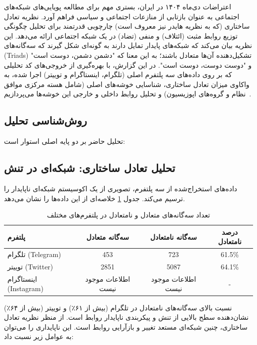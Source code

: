 \documentclass{article}
\begin{document}
	اعتراضات دی‌ماه ۱۴۰۴ در ایران، بستری مهم برای مطالعه پویایی‌های شبکه‌های اجتماعی به عنوان بازتابی از منازعات اجتماعی و سیاسی فراهم آورد. نظریه تعادل ساختاری (که به نظریه هایدر نیز معروف است) چارچوبی قدرتمند برای تحلیل چگونگی توزیع روابط مثبت (ائتلاف) و منفی (تضاد) در یک شبکه اجتماعی ارائه می‌دهد. این نظریه بیان می‌کند که شبکه‌های پایدار تمایل دارند به گونه‌ای شکل گیرند که سه‌گانه‌های (Triads) تشکیل‌دهنده آن‌ها متعادل باشند؛ به این معنا که "دشمن دشمن، دوست است" و "دوست دوست، دوست است". در این گزارش، با بهره‌گیری از خروجی‌های کد تحلیلی که بر روی داده‌های سه پلتفرم اصلی (تلگرام، اینستاگرام و توییتر) اجرا شده، به واکاوی میزان تعادل ساختاری، شناسایی خوشه‌های اصلی (شامل هسته مرکزی موافق نظام و گروه‌های اپوزیسیون) و تحلیل روابط داخلی و خارجی این خوشه‌ها می‌پردازیم~\cite{barabasi1999scaling}.
	
	\subsection{روش‌شناسی تحلیل}
	تحلیل حاضر بر دو پایه اصلی استوار است:
	
	\subsection{تحلیل تعادل ساختاری: شبکه‌ای در تنش}
	داده‌های استخراج‌شده از سه پلتفرم، تصویری از یک اکوسیستم شبکه‌ای ناپایدار را ترسیم می‌کند. جدول \ref{tab:triads} خلاصه‌ای از این داده‌ها را نشان می‌دهد.
	
	\begin{table}[h!]
		\centering
		\caption{تعداد سه‌گانه‌های متعادل و نامتعادل در پلتفرم‌های مختلف}
		\label{tab:triads}
		\begin{tabular}{@{}lccc@{}}
			\toprule
			\textbf{پلتفرم} & \textbf{سه‌گانه متعادل} & \textbf{سه‌گانه نامتعادل} & \textbf{درصد نامتعادل} \\ \midrule
			تلگرام (Telegram)   & 453                    & 723                      & 61.5\% \\
			توییتر (Twitter)    & 2851                   & 5087                     & 64.1\% \\
			اینستاگرام (Instagram) & اطلاعات موجود نیست       & اطلاعات موجود نیست        & - \\ \bottomrule
		\end{tabular}
	\end{table}
	
	نسبت بالای سه‌گانه‌های نامتعادل در تلگرام (بیش از ۶۱٪) و توییتر (بیش از ۶۴٪) نشان‌دهنده سطح بالایی از تنش و پیکربندی ناپایدار روابط است. از منظر نظریه تعادل ساختاری، چنین شبکه‌ای مستعد تغییر و بازآرایی روابط است. این ناپایداری را می‌توان به عوامل زیر نسبت داد:
	
\end{document}
